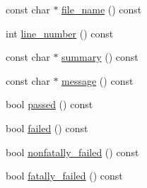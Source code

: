 \begin{DoxyCompactItemize}
\item 
const char $\ast$ \hyperlink{classtesting_1_1_test_part_result_a5d8742dc28ddb880cd2391edb9fc2c9b}{file\-\_\-name} () const 
\item 
int \hyperlink{classtesting_1_1_test_part_result_a174900cf4403d23784af34f50e7b0a46}{line\-\_\-number} () const 
\item 
const char $\ast$ \hyperlink{classtesting_1_1_test_part_result_af0d4f960b453ce087c581fe13817b2a3}{summary} () const 
\item 
const char $\ast$ \hyperlink{classtesting_1_1_test_part_result_aae73962246be4d200e2c1d04246a708a}{message} () const 
\item 
bool \hyperlink{classtesting_1_1_test_part_result_a901bd62d9fbe7f39826a9d02ab2bdaec}{passed} () const 
\item 
bool \hyperlink{classtesting_1_1_test_part_result_aaf835515fb53eb1aa01c1798b05e61f6}{failed} () const 
\item 
bool \hyperlink{classtesting_1_1_test_part_result_a7bb08c87fbc1664f9fcca1504339ed29}{nonfatally\-\_\-failed} () const 
\item 
bool \hyperlink{classtesting_1_1_test_part_result_a34d31718b5fc6c06f73d03e8dbb1aa9e}{fatally\-\_\-failed} () const 
\end{DoxyCompactItemize}


